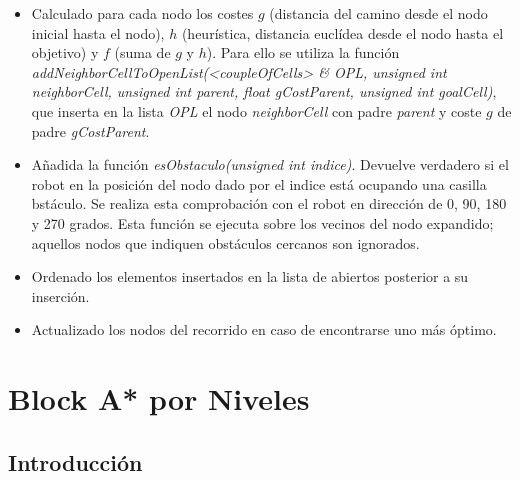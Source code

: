 \documentclass[11pt,spanish]{article} %
\begin{document}
\begin{itemize}
  \item Calculado para cada nodo los costes $g$ (distancia del camino desde el nodo inicial hasta el nodo), $h$ (heurística, distancia euclídea desde el nodo hasta el objetivo) y $f$ (suma de $g$ y $h$). Para ello se utiliza la función \textit{addNeighborCellToOpenList({\textless}coupleOfCells{\textgreater} \& OPL, unsigned int neighborCell, unsigned int parent, float gCostParent, unsigned int goalCell)}, que inserta en la lista \textit{OPL} el nodo \textit{neighborCell} con padre \textit{parent} y coste $g$ de padre \textit{gCostParent}.

  \item Añadida la función \textit{esObstaculo(unsigned int indice)}. Devuelve verdadero si el robot en la posición del nodo dado por el indice está ocupando una casilla bstáculo. Se realiza esta comprobación con el robot en dirección de 0, 90, 180 y 270 grados. Esta función se ejecuta sobre los vecinos del nodo expandido; aquellos nodos que indiquen obstáculos cercanos son ignorados.

  \item Ordenado los elementos insertados en la lista de abiertos posterior a su inserción.
  
  \item Actualizado los nodos del recorrido en caso de encontrarse uno más óptimo.

\end{itemize}

  

\section{Block A* por Niveles}

\subsection{Introducción}
\end{document}
